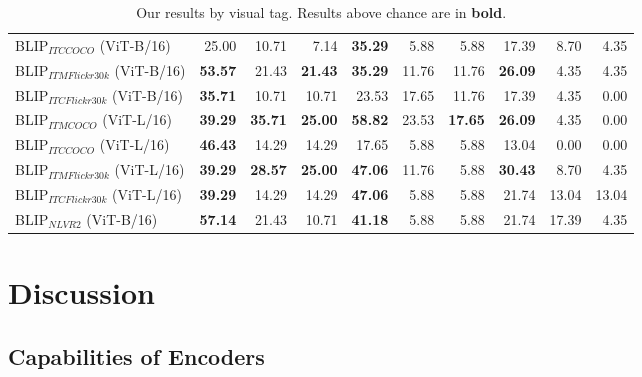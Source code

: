 \begin{table}[ht]
\begin{adjustbox}{max width=0.8\textwidth}
\begin{tabular}{l|rrr|rrr|rrr}
 BLIP$_{ITC COCO}$ (ViT-B/16)        & 25.00          & 10.71          & 7.14           & \textbf{35.29} & 5.88           & 5.88           & 17.39          & 8.70           & 4.35           \\
 BLIP$_{ITM Flickr30k}$ (ViT-B/16)   & \textbf{53.57} & 21.43          & \textbf{21.43} & \textbf{35.29} & 11.76          & 11.76          & \textbf{26.09} & 4.35           & 4.35           \\
 BLIP$_{ITC Flickr30k}$ (ViT-B/16)   & \textbf{35.71} & 10.71          & 10.71          & 23.53          & 17.65          & 11.76          & 17.39          & 4.35           & 0.00           \\
 BLIP$_{ITM COCO}$ (ViT-L/16)        & \textbf{39.29} & \textbf{35.71} & \textbf{25.00} & \textbf{58.82} & 23.53          & \textbf{17.65} & \textbf{26.09} & 4.35           & 0.00           \\
 BLIP$_{ITC COCO}$ (ViT-L/16)        & \textbf{46.43} & 14.29          & 14.29          & 17.65          & 5.88           & 5.88           & 13.04          & 0.00           & 0.00           \\
 BLIP$_{ITM Flickr30k}$ (ViT-L/16)   & \textbf{39.29} & \textbf{28.57} & \textbf{25.00} & \textbf{47.06} & 11.76          & 5.88           & \textbf{30.43} & 8.70           & 4.35           \\
 BLIP$_{ITC Flickr30k}$ (ViT-L/16)   & \textbf{39.29} & 14.29          & 14.29          & \textbf{47.06} & 5.88           & 5.88           & 21.74          & 13.04          & 13.04          \\
 BLIP$_{NLVR2}$ (ViT-B/16)           & \textbf{57.14} & 21.43          & 10.71          & \textbf{41.18} & 5.88           & 5.88           & 21.74          & 17.39          & 4.35           \\
\bottomrule
\end{tabular}
  \end{adjustbox}
  \caption{Our results by visual tag. Results above chance are in \textbf{bold}.}
    \label{tab:results-by-visual-tag-ours}
\end{table}

\section{Discussion} \label{sec:winoground_disussion}

\subsection{Capabilities of Encoders}


